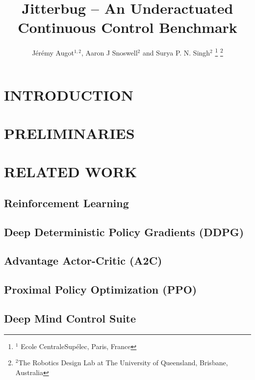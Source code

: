 \documentclass[letterpaper, 10 pt, conference]{ieeeconf}
\title{\LARGE \bf
Jitterbug -- An Underactuated Continuous Control Benchmark
}
\author{
    J\'er\'emy Augot$^{1,2}$, Aaron J Snoswell$^{2}$ and Surya P. N. Singh$^{2}$
\thanks{
    $^{1}$ Ecole CentraleSup\'elec, Paris, France
}%
\thanks{
    $^{2}$The Robotics Design Lab at The University of Queensland, Brisbane, Australia
}%
}
\begin{document}
\maketitle
\thispagestyle{empty}
\pagestyle{empty}

\begin{abstract}

\lipsum[1]

\end{abstract}

\section{INTRODUCTION}

\lipsum[1]

\section{PRELIMINARIES}

\section{RELATED WORK}

\subsection{Reinforcement Learning}

\subsection{Deep Deterministic Policy Gradients (DDPG)}

\subsection{Advantage Actor-Critic (A2C)}

\subsection{Proximal Policy Optimization (PPO)}

\subsection{Deep Mind Control Suite}
\end{document}
